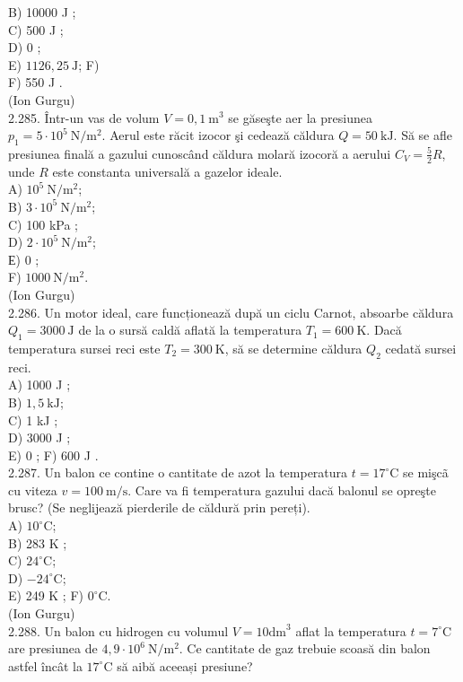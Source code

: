 \documentclass[10pt]{article}
\begin{document}
B) 10000 J ;\\
C) 500 J ;\\
D) 0 ;\\
E) $1126,25 \mathrm{~J}$; F)\\
F) 550 J .\\
(Ion Gurgu)\\
2.285. Într-un vas de volum $V=0,1 \mathrm{~m}^{3}$ se găseşte aer la presiunea $p_{1}=5 \cdot 10^{5} \mathrm{~N} / \mathrm{m}^{2}$. Aerul este răcit izocor şi cedează căldura $Q=50 \mathrm{~kJ}$. Să se afle presiunea finală a gazului cunoscând căldura molară izocoră a aerului $C_{V}=\frac{5}{2} R$, unde $R$ este constanta universală a gazelor ideale.\\
A) $10^{5} \mathrm{~N} / \mathrm{m}^{2}$;\\
B) $3 \cdot 10^{5} \mathrm{~N} / \mathrm{m}^{2}$;\\
C) 100 kPa ;\\
D) $2 \cdot 10^{5} \mathrm{~N} / \mathrm{m}^{2}$;\\
Е) 0 ;\\
F) $1000 \mathrm{~N} / \mathrm{m}^{2}$.\\
(Ion Gurgu)\\
2.286. Un motor ideal, care funcționează după un ciclu Carnot, absoarbe căldura $Q_{1}=3000 \mathrm{~J}$ de la o sursă caldă aflată la temperatura $T_{1}=600 \mathrm{~K}$. Dacă temperatura sursei reci este $T_{2}=300 \mathrm{~K}$, să se determine căldura $Q_{2}$ cedată sursei reci.\\
A) 1000 J ;\\
B) $1,5 \mathrm{~kJ}$;\\
C) 1 kJ ;\\
D) 3000 J ;\\
E) 0 ; F) 600 J .\\
2.287. Un balon ce contine o cantitate de azot la temperatura $t=17^{\circ} \mathrm{C}$ se mişcã cu viteza $v=100 \mathrm{~m} / \mathrm{s}$. Care va fi temperatura gazului dacă balonul se opreşte brusc? (Se neglijează pierderile de căldură prin pereți).\\
A) $10^{\circ} \mathrm{C}$;\\
B) 283 K ;\\
C) $24^{\circ} \mathrm{C}$;\\
D) $-24^{\circ} \mathrm{C}$;\\
E) 249 K ; F) $0^{\circ} \mathrm{C}$.\\
(Ion Gurgu)\\
2.288. Un balon cu hidrogen cu volumul $V=10 \mathrm{dm}^{3}$ aflat la temperatura $t=7^{\circ} \mathrm{C}$ are presiunea de $4,9 \cdot 10^{6} \mathrm{~N} / \mathrm{m}^{2}$. Ce cantitate de gaz trebuie scoasă din balon astfel încât la $17^{\circ} \mathrm{C}$ să aibă aceeași presiune?\\
\end{document}
